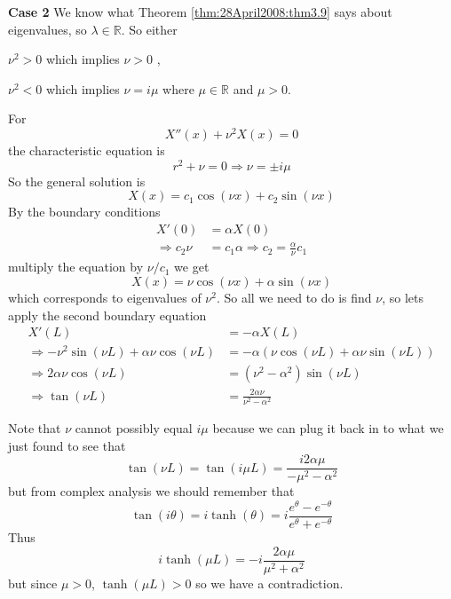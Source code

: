 \begin{ex}
\textbf{Case 2} We know what Theorem
\eqref{thm:28April2008:thm3.9} says about eigenvalues, so
$\lambda\in\mathbb{R}$. So either \begin{inparaenum}\item
  $\nu^2>0$ which implies $\nu>0$ , \item $\nu^2<0$ which implies $\nu=i\mu$
  where $\mu\in\mathbb{R}$ and $\mu>0$.\end{inparaenum} For
\begin{equation} 
X''(x)+\nu^2X(x) = 0
\end{equation}
the characteristic equation is
\begin{equation}
r^2 + \nu = 0\Rightarrow \nu=\pm i\mu
\end{equation}
So the general solution is
\begin{equation}
X(x) = c_{1}\cos(\nu x) + c_{2}\sin(\nu x)
\end{equation}
By the boundary conditions
\begin{align*}
X'(0) &= \alpha X(0)\\
\Rightarrow c_{2}\nu &= c_{1}\alpha\Rightarrow c_{2} = \frac{\alpha}{\nu}c_{1}
\end{align*}
multiply the equation by $\nu/c_1$ we get
\begin{equation}
X(x) = \nu\cos(\nu x) + \alpha\sin(\nu x)
\end{equation}
which corresponds to eigenvalues of $\nu^2$. So all we need
to do is find $\nu$, so lets apply the second boundary
equation
\begin{subequations}
\begin{align}
X'(L) &= -\alpha X(L)\\
\Rightarrow -\nu^2\sin(\nu L)+\alpha\nu\cos(\nu L) &=
-\alpha\left(\nu\cos(\nu L)+\alpha\nu\sin(\nu L)\right)\\
\Rightarrow 2\alpha\nu\cos(\nu L) &=
(\nu^2-\alpha^2)\sin(\nu L)\\
\Rightarrow \tan(\nu L) &= \frac{2\alpha\nu}{\nu^2-\alpha^2}
\end{align}
\end{subequations}
\end{ex}

\begin{rmk}
Note that $\nu$ cannot possibly equal $i\mu$ because we can
plug it back in to what we just found to see that
\begin{equation}
\tan(\nu L) = \tan(i\mu L) =
\frac{i2\alpha\mu}{-\mu^2-\alpha^2}
\end{equation}
but from complex analysis we should remember that
\begin{equation}
\tan(i\theta) = i\tanh(\theta) = i\frac{e^{\theta}-e^{-\theta}}{e^{\theta}+e^{-\theta}}
\end{equation}
Thus
\begin{equation}
i\tanh(\mu L) = -i\frac{2\alpha\mu}{\mu^2+\alpha^2}
\end{equation}
but since $\mu>0$, $\tanh(\mu L)>0$ so we have a
contradiction. 
\end{rmk}

